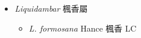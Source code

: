 
  \begin{itemize}
 \item[] \textit{Liquidambar} 楓香屬
                                
  \begin{itemize}
        \item[] \textit{L. formosana} Hance  楓香   LC
  \end{itemize}
  \end{itemize}
